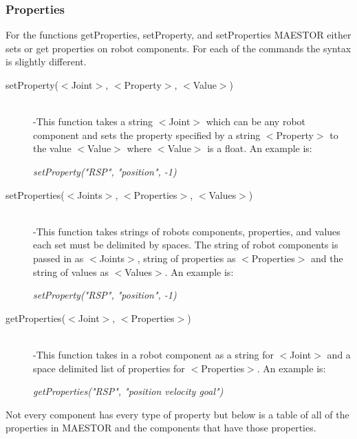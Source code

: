 \documentclass[12pt]{article}
\begin{document}
\subsubsection{Properties}
For the functions getProperties, setProperty, and setProperties MAESTOR either sets or get properties on robot components. For each of the commands the syntax is slightly different.
\begin{description}
	\item[setProperty($<$Joint$>$, $<$Property$>$, $<$Value$>$)] \hfill \\
	-This function takes a string $<$Joint$>$ which can be any robot component and sets the property specified by a string $<$Property$>$ to the value $<$Value$>$ where $<$Value$>$ is a float. An example is:
	
	\begin{center}
		\textit{setProperty("RSP", "position", -1)}
	\end{center}
	
	\item[setProperties($<$Joints$>$, $<$Properties$>$, $<$Values$>$)] \hfill \\
	-This function takes strings of robots components, properties, and values each set must be delimited by spaces. The string of robot components is passed in as $<$Joints$>$, string of properties as $<$Properties$>$ and the string of values as $<$Values$>$. An example is:
	
	\begin{center}
		\textit{setProperty("RSP", "position", -1)}
	\end{center}
	
	\item[getProperties($<$Joint$>$, $<$Properties$>$)] \hfill \\
	-This function takes in a robot component as a string for $<$Joint$>$ and a space delimited list of properties for $<$Properties$>$. An example is:
	
	\begin{center}
		\textit{getProperties("RSP", "position velocity goal")}
	\end{center}
	
\end{description}


\noindent Not every component has every type of property but below is a table of all of the properties in MAESTOR and the components that have those properties. 
\end{document}
